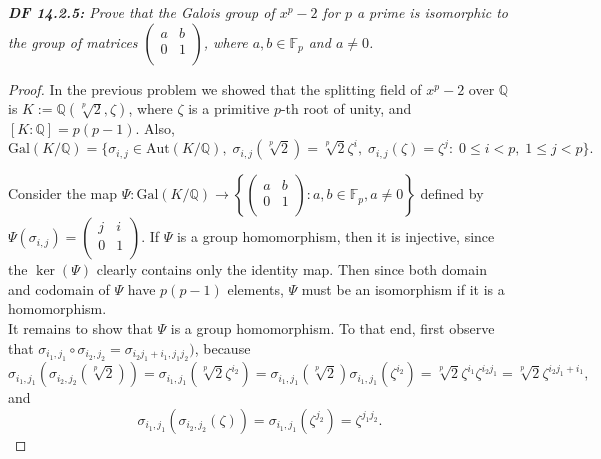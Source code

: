 \documentclass{article}
\begin{document}
\it \textbf{DF 14.2.5:} Prove that the Galois group of $x^p-2$ for $p$ a
  prime is isomorphic to the group of matrices $\begin{pmatrix} a&b\\ 0&1\\
  \end{pmatrix}$, where $a,b\in\mathbb{F}_p$ and $a\neq0$.

  \begin{proof}
    In the previous problem we showed that the splitting field of $x^p-2$
    over $\mathbb{Q}$ is $K:=\mathbb{Q}(\sqrt[p]{2},\zeta)$, where
    $\zeta$ is a primitive $p$-th root of unity, and
    $[K:\mathbb{Q}]=p(p-1)$. Also,
    \[\text{Gal}(K/\mathbb{Q}) =\{\sigma_{i,j}\in\text{Aut}(K/\mathbb{Q}),\;
    \sigma_{i,j}(\sqrt[p]{2})=\sqrt[p]{2}\zeta^i,\;
    \sigma_{i,j}(\zeta)=\zeta^j:\; 0\leq i<p,\; 1\leq j<p\}.\]

    Consider the map $\Psi:\text{Gal}(K/\mathbb{Q}) \rightarrow \left\{
    \begin{pmatrix} a&b\\ 0&1\\ \end{pmatrix}: a,b\in\mathbb{F}_p, a\neq0
    \right\}$ defined by $\Psi(\sigma_{i,j}) =\begin{pmatrix} j&i\\ 0&1\\
    \end{pmatrix}$. If $\Psi$ is a group homomorphism, then it is
    injective, since the $\ker(\Psi)$ clearly contains only the identity
    map. Then since both domain and codomain of $\Psi$ have $p(p-1)$
    elements, $\Psi$ must be an isomorphism if it is a homomorphism. \\

    It remains to show that $\Psi$ is a group homomorphism. To that end,
    first observe that
    $\sigma_{i_1,j_1}\circ\sigma_{i_2,j_2} =\sigma_{i_2j_1+i_1,j_1j_2})$,
    because
    \[\sigma_{i_1,j_1} (\sigma_{i_2,j_2}(\sqrt[p]{2}))
    =\sigma_{i_1,j_1}(\sqrt[p]{2}\zeta^{i_2})
    =\sigma_{i_1,j_1}(\sqrt[p]{2}) \sigma_{i_1,j_1}(\zeta^{i_2})
    =\sqrt[p]{2}\zeta^{i_1}\zeta^{i_2j_1}
    =\sqrt[p]{2}\zeta^{i_2j_1+i_1},\]
    and
    \[\sigma_{i_1,j_1} (\sigma_{i_2,j_2}(\zeta))
    =\sigma_{i_1,j_1}(\zeta^{j_2})
    =\zeta^{j_1j_2}.\]


\end{proof}
\end{document}
